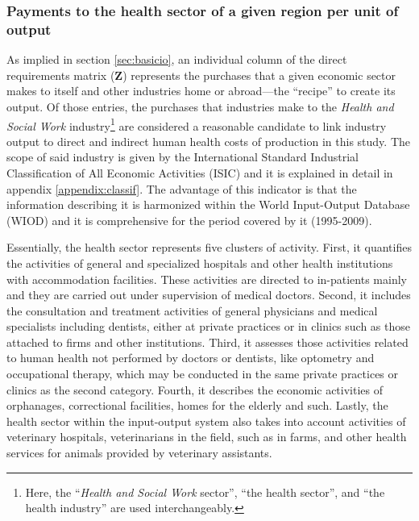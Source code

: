\documentclass[a4paper,12pt]{article}
\begin{document}
\subsubsection{Payments to the health sector of a given region per unit of output}
\label{subsec:payhealth}

As implied in section \ref{sec:basicio}, an individual column of the direct requirements matrix ($\textbf{Z}$) represents the purchases that a given economic sector makes to itself and other industries home or abroad---the ``recipe'' to create its output. Of those entries, the purchases that industries make to the \textit{Health and Social Work} industry\footnote{Here, the ``\textit{Health and Social Work} sector'', ``the health sector'', and ``the health industry'' are used interchangeably.} are considered a reasonable candidate to link industry output to direct and indirect human health costs of production in this study. The scope of said industry is given by
the International Standard Industrial Classification of All Economic Activities (ISIC) and it is explained in detail in appendix \ref{appendix:classif}. The advantage of this indicator is that the information describing it is harmonized within the World Input-Output Database (WIOD) and it is comprehensive for the period covered by it (1995-2009).

Essentially, the health sector represents five clusters of activity. First, it quantifies the activities of general and specialized hospitals and other health institutions with accommodation facilities. These activities are directed to in-patients mainly and they are carried out under supervision of medical doctors. Second, it includes the consultation and treatment activities of general physicians and medical specialists including dentists, either at private practices or in clinics such as those attached to firms and other institutions. Third, it assesses those activities related to human health not performed by doctors or dentists, like optometry and occupational therapy, which may be conducted in the same private practices or clinics as the second category. Fourth, it describes the economic activities of orphanages, correctional facilities, homes for the elderly and such. Lastly, the health sector within the input-output system also takes into account activities of veterinary hospitals, veterinarians in the field, such as in farms, and other health services for animals provided by veterinary assistants.

\end{document}
